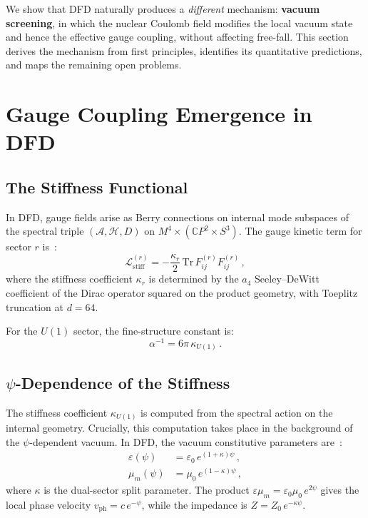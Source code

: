 \documentclass[aps,prd,twocolumn,superscriptaddress,nofootinbib]{revtex4-2}
\newcommand{\kap}{\kappa}
\newcommand{\calL}{\mathcal{L}}
\newcommand{\ainv}{\alpha^{-1}}
\begin{document}
We show that DFD naturally produces a \emph{different} mechanism:
\textbf{vacuum screening}, in which the nuclear Coulomb field modifies
the local vacuum state and hence the effective gauge coupling, without
affecting free-fall.  This section derives the mechanism from first
principles, identifies its quantitative predictions, and maps the
remaining open problems.


\section{Gauge Coupling Emergence in DFD}
\label{sec:gauge}

\subsection{The Stiffness Functional}

In DFD, gauge fields arise as Berry connections on internal mode
subspaces of the spectral triple
$(\mathcal{A}, \mathcal{H}, D)$ on
$M^4 \times (\mathbb{C}P^2 \times S^3)$.
The gauge kinetic term for sector $r$ is~\cite{Alcock2026FSC}:
\begin{equation}\label{eq:stiffness}
\calL^{(r)}_{\mathrm{stiff}} = -\frac{\kap_r}{2}\,\mathrm{Tr}\,
F^{(r)}_{ij} F^{(r)}_{ij}\,,
\end{equation}
where the stiffness coefficient $\kap_r$ is determined by the $a_4$
Seeley--DeWitt coefficient of the Dirac operator squared on the product
geometry, with Toeplitz truncation at $d = 64$.

For the $U(1)$ sector, the fine-structure constant is:
\begin{equation}\label{eq:alpha-kappa}
\boxed{\ainv = 6\pi\,\kap_{U(1)}\,.}
\end{equation}

\subsection{$\psi$-Dependence of the Stiffness}
\label{sec:psi-dep}

The stiffness coefficient $\kap_{U(1)}$ is computed from the spectral
action on the internal geometry.  Crucially, this computation takes
place in the background of the $\psi$-dependent vacuum.  In DFD,
the vacuum constitutive parameters are~\cite{Alcock2026Core}:
\begin{align}
\varepsilon(\psi) &= \varepsilon_0\,e^{(1+\kap)\psi}\,,
\label{eq:eps}\\
\mu_m(\psi) &= \mu_0\,e^{(1-\kap)\psi}\,,
\label{eq:mu}
\end{align}
where $\kap$ is the dual-sector split parameter.  The product
$\varepsilon\mu_m = \varepsilon_0\mu_0\,e^{2\psi}$ gives the
local phase velocity $v_{\mathrm{ph}} = c\,e^{-\psi}$, while the
impedance is $Z = Z_0\,e^{-\kap\psi}$.
\end{document}
